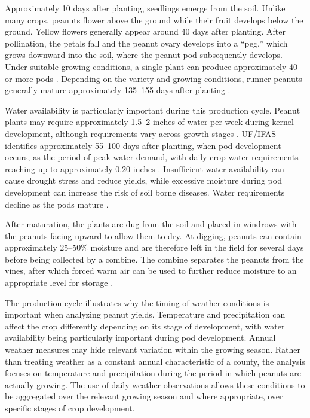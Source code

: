 \documentclass{article}
\begin{document}
Approximately 10 days after planting, seedlings emerge from the soil. Unlike many crops, peanuts flower above the ground while their fruit develops below the ground. Yellow flowers generally appear around 40 days after planting. After pollination, the petals fall and the peanut ovary develops into a ``peg,'' which grows downward into the soil, where the peanut pod subsequently develops. Under suitable growing conditions, a single plant can produce approximately 40 or more pods \cite{FloridaPeanutsIndustry}. Depending on the variety and growing conditions, runner peanuts generally mature approximately 135--155 days after planting \cite{PeanutProductionGuide}.

Water availability is particularly important during this production cycle. Peanut plants may require approximately 1.5--2 inches of water per week during kernel development, although requirements vary across growth stages \cite{FloridaPeanutsIndustry}. UF/IFAS identifies approximately 55--100 days after planting, when pod development occurs, as the period of peak water demand, with daily crop water requirements reaching up to approximately 0.20 inches \cite{PeanutProductionGuide}. Insufficient water availability can cause drought stress and reduce yields, while excessive moisture during pod development can increase the risk of soil borne diseases. Water requirements decline as the pods mature \cite{PeanutProductionGuide}.

After maturation, the plants are dug from the soil and placed in windrows with the peanuts facing upward to allow them to dry. At digging, peanuts can contain approximately 25--50\% moisture and are therefore left in the field for several days before being collected by a combine. The combine separates the peanuts from the vines, after which forced warm air can be used to further reduce moisture to an appropriate level for storage \cite{FloridaPeanutsIndustry,PeanutProductionGuide}.

The production cycle illustrates why the timing of weather conditions is important when analyzing peanut yields. Temperature and precipitation can affect the crop differently depending on its stage of development, with water availability being particularly important during pod development. Annual weather measures may hide relevant variation within the growing season. Rather than treating weather as a constant annual characteristic of a county, the  analysis focuses on temperature and precipitation during the period in which peanuts are actually growing. The use of daily weather observations allows these conditions to be aggregated over the relevant growing season and where appropriate, over specific stages of crop development.
\end{document}
